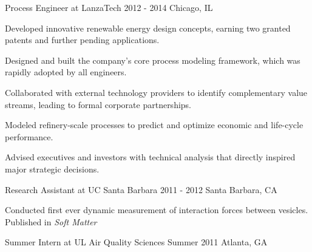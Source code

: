 \begin{cventries}
  \cventrynew
    {Process Engineer at LanzaTech} 
    {2012 - 2014} 
    {Chicago, IL} 
    {
      \begin{cvitems}
        \item {Developed innovative renewable energy design concepts, earning two granted patents and further pending applications.}
		\item {Designed and built the company's core process modeling framework, which was rapidly adopted by all engineers.}        
		\item {Collaborated with external technology providers to identify complementary value streams, leading to formal corporate partnerships.}
        \item {Modeled refinery-scale processes to predict and optimize economic and life-cycle performance.}        
        \item {Advised executives and investors with technical analysis that directly inspired major strategic decisions.}
      \end{cvitems}
    }
    
  \cventryshort
    {Research Assistant at UC Santa Barbara}
    {2011 - 2012}
    {Santa Barbara, CA}         
    {
      \begin{cvitems} 
        \item {Conducted first ever dynamic measurement of interaction forces between vesicles. Published in \emph{Soft Matter}}        
      \end{cvitems}
    }   
  
   \cventryshort
	{Summer Intern at UL Air Quality Sciences}    
    {Summer 2011}
    {Atlanta, GA}
    {}



\end{cventries}
